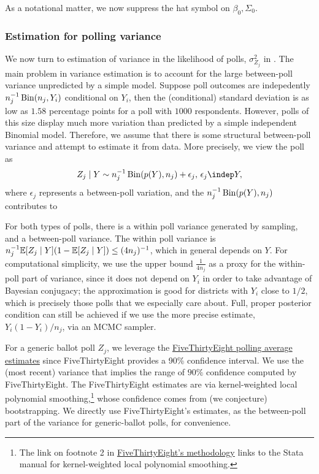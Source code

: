 \documentclass[12pt, letterpaper]{article}
\begin{document}
As a notational matter, we now suppress the hat symbol on $\beta_0, \Sigma_0.$

\subsubsection{Estimation for polling variance}
\label{subsub:var_poll}
We now turn to estimation of variance in the likelihood of polls, $\sigma_{Z_j}^2$ in . The main problem in variance estimation is to account for the large between-poll variance unpredicted by a simple model. Suppose poll outcomes are indepedently $n_j^{-1} \operatorname{Bin}(n_j, Y_i)$ conditional on $Y_i$, then the (conditional) standard deviation is as low as $1.58$ percentage points for a poll with $1000$ respondents. However, polls of this size display much more variation than predicted by a simple independent Binomial model. Therefore, we assume that there is some structural between-poll variance and attempt to estimate it from data. More precisely, we view the poll as \[
Z_j \mid Y \sim n_j^{-1}\Bin(p(Y), n_j) + \epsilon_j, \, \epsilon_j \indep Y,
\]
where $\epsilon_j$ represents a between-poll variation, and the $n_j^{-1}\operatorname{Bin}(p(Y), n_j) $ contributes to 


For both types of polls, there is a within poll variance generated by sampling, and a between-poll variance. The within poll variance is $n_j^{-1}\mathbb{E}[Z_j \mid Y](1-\mathbb{E}[Z_j\mid Y]) \le (4n_j)^{-1}$, which in general depends on $Y$. For computational simplicity, we use the upper bound $\frac{1}{4n_j}$ as a proxy for the within-poll part of variance, since it does not depend on $Y_i$ in order to take advantage of Bayesian conjugacy; the approximation is good for districts with $Y_i$ close to $1/2$, which is precisely those polls that we especially care about. Full, proper posterior condition can still be achieved if we use the more precise estimate, $Y_i(1-Y_i)/n_j$, via an MCMC sampler. 

For a generic ballot poll $Z_j$, we leverage the \href{https://projects.fivethirtyeight.com/congress-generic-ballot-polls/}{FiveThirtyEight polling average estimates} since FiveThirtyEight provides a 90\% confidence interval. We use the (most recent) variance that implies the range of $90\%$ confidence computed by FiveThirtyEight. The FiveThirtyEight estimates are via kernel-weighted local polynomial smoothing,\footnote{The link on footnote 2 in \href{https://fivethirtyeight.com/features/heres-a-new-less-volatile-version-of-our-generic-ballot-tracker/}{FiveThirtyEight's methodology} links to the Stata manual for kernel-weighted local polynomial smoothing.} whose confidence comes from (we conjecture) bootstrapping. We directly use FiveThirtyEight's estimates, as the between-poll part of the variance for generic-ballot polls, for convenience. 
\end{document}
